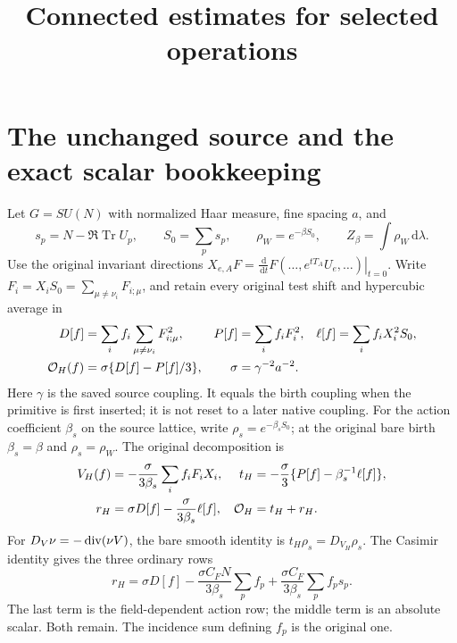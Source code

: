 \documentclass[11pt,letterpaper]{article}
\title{Connected estimates for selected operations}\author{}\date{}
\theoremstyle{plain}
\theoremstyle{remark}\newtheorem{remark}[theorem]{Scope}
\DeclareMathOperator{\Tr}{Tr}\DeclareMathOperator{\Vol}{Vol}
\newcommand{\dd}{\,\mathrm d}\newcommand{\OH}{\mathcal O_H}
\begin{document}
\maketitle
\section{The unchanged source and the exact scalar bookkeeping}
\label{sec:source}

Let $G=SU(N)$ with normalized Haar measure, fine spacing $a$, and
\begin{equation}
s_p=N-\Re\Tr U_p,\qquad S_0=\sum_p s_p,\qquad
\rho_W=e^{-\beta S_0},\qquad Z_\beta=\int\rho_W\dd\lambda.
\end{equation}
Use the original invariant directions
$X_{e,A}F=\left.\frac{\dd}{\dd t}F(\ldots,e^{tT_A}U_e,\ldots)\right|_{t=0}$.
Write $F_i=X_iS_0=\sum_{\mu\ne\nu_i}F_{i;\mu}$, and retain every
original test shift and hypercubic average in
\begin{align}
D[f]&=\sum_i f_i\sum_{\mu\ne\nu_i}F_{i;\mu}^2,
&P[f]&=\sum_i f_iF_i^2,
&\ell[f]&=\sum_i f_iX_i^2S_0,\notag\\
\OH(f)&=\sigma\{D[f]-P[f]/3\},
&\sigma&=\gamma^{-2}a^{-2}.
\label{eq:H}
\end{align}
Here $\gamma$ is the saved source coupling. It equals the birth coupling when
the primitive is first inserted; it is not reset to a later native coupling.
For the action coefficient $\beta_s$ on the source lattice, write
$\rho_s=e^{-\beta_sS_0}$; at the original bare birth $\beta_s=\beta$ and
$\rho_s=\rho_W$. The original decomposition is
\begin{align}
V_H(f)&=-\frac{\sigma}{3\beta_s}\sum_i f_iF_iX_i,
&t_H&=-\frac{\sigma}{3}\{P[f]-\beta_s^{-1}\ell[f]\},\notag\\
r_H&=\sigma D[f]-\frac{\sigma}{3\beta_s}\ell[f],
&\OH&=t_H+r_H.
\label{eq:Hdecomp}
\end{align}
For $D_V\nu=-\operatorname{div}(\nu V)$, the bare smooth identity is
$t_H\rho_s=D_{V_H}\rho_s$.
The Casimir identity gives the three ordinary rows
\begin{equation}
r_H=\sigma D[f]
-\frac{\sigma C_FN}{3\beta_s}\sum_p f_p
+\frac{\sigma C_F}{3\beta_s}\sum_p f_ps_p.
\label{eq:Casimir}
\end{equation}
The last term is the field-dependent action row; the middle term is an absolute
scalar. Both remain. The incidence sum defining $f_p$ is the original one.
\end{document}
